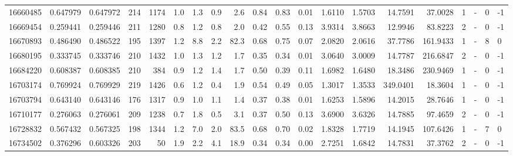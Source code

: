 \begin{tabular}{rrrrrrrrrrrrrrrrrlrl}
  16660485 & 0.647979 &   0.647972 &  214 & 1174 &      1.0 &      1.3 &     0.9 &      2.6 &       0.84 &        0.83 &        0.01 &  1.6110 &  1.5703 &   14.7591 &   37.0028 &       1 &             - &        0 &        -1 \\
  16669454 & 0.259441 &   0.259446 &  211 & 1280 &      0.8 &      1.2 &     0.8 &      2.0 &       0.42 &        0.55 &        0.13 &  3.9314 &  3.8663 &   12.9946 &   83.8223 &       2 &             - &        0 &        -1 \\
  16670893 & 0.486490 &   0.486522 &  195 & 1397 &      1.2 &      8.8 &     2.2 &     82.3 &       0.68 &        0.75 &        0.07 &  2.0820 &  2.0616 &   37.7786 &  161.9433 &       1 &             - &        8 &         0 \\
  16680195 & 0.333745 &   0.333746 &  210 & 1432 &      1.0 &      1.3 &     1.2 &      1.7 &       0.35 &        0.34 &        0.01 &  3.0640 &  3.0009 &   14.7787 &  216.6847 &       2 &             - &        0 &        -1 \\
  16684220 & 0.608387 &   0.608385 &  210 &  384 &      0.9 &      1.2 &     1.4 &      1.7 &       0.50 &        0.39 &        0.11 &  1.6982 &  1.6480 &   18.3486 &  230.9469 &       1 &             - &        0 &        -1 \\
  16703174 & 0.769924 &   0.769929 &  219 & 1426 &      0.6 &      1.2 &     0.4 &      1.9 &       0.54 &        0.49 &        0.05 &  1.3017 &  1.3533 &  349.0401 &   18.3604 &       1 &             - &        0 &        -1 \\
  16703794 & 0.643140 &   0.643146 &  176 & 1317 &      0.9 &      1.0 &     1.1 &      1.4 &       0.37 &        0.38 &        0.01 &  1.6253 &  1.5896 &   14.2015 &   28.7646 &       1 &             - &        0 &        -1 \\
  16710177 & 0.276063 &   0.276061 &  209 & 1238 &      0.7 &      1.8 &     0.5 &      3.1 &       0.37 &        0.50 &        0.13 &  3.6900 &  3.6326 &   14.7885 &   97.4659 &       2 &             - &        0 &        -1 \\
  16728832 & 0.567432 &   0.567325 &  198 & 1344 &      1.2 &      7.0 &     2.0 &     83.5 &       0.68 &        0.70 &        0.02 &  1.8328 &  1.7719 &   14.1945 &  107.6426 &       1 &             - &        7 &         0 \\
  16734502 & 0.376296 &   0.603326 &  203 &   50 &      1.9 &      2.2 &     4.1 &     18.9 &       0.34 &        0.34 &        0.00 &  2.7251 &  1.6842 &   14.7831 &   37.3762 &       2 &             - &        0 &        -1 \\

\end{tabular}
